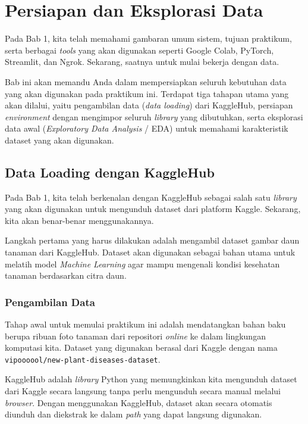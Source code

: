 ﻿\chapter{Persiapan dan Eksplorasi Data}

Pada Bab 1, kita telah memahami gambaran umum sistem, tujuan praktikum, serta berbagai \textit{tools} yang akan digunakan seperti Google Colab, PyTorch, Streamlit, dan Ngrok. Sekarang, saatnya untuk mulai bekerja dengan data.

Bab ini akan memandu Anda dalam mempersiapkan seluruh kebutuhan data yang akan digunakan pada praktikum ini. Terdapat tiga tahapan utama yang akan dilalui, yaitu pengambilan data (\textit{data loading}) dari KaggleHub, persiapan \textit{environment} dengan mengimpor seluruh \textit{library} yang dibutuhkan, serta eksplorasi data awal (\textit{Exploratory Data Analysis} / EDA) untuk memahami karakteristik dataset yang akan digunakan.

\section{Data Loading dengan KaggleHub}

Pada Bab 1, kita telah berkenalan dengan KaggleHub sebagai salah satu \textit{library} yang akan digunakan untuk mengunduh dataset dari platform Kaggle. Sekarang, kita akan benar-benar menggunakannya.

Langkah pertama yang harus dilakukan adalah mengambil dataset gambar daun tanaman dari KaggleHub. Dataset akan digunakan sebagai bahan utama untuk melatih model \textit{Machine Learning} agar mampu mengenali kondisi kesehatan tanaman berdasarkan citra daun.

\subsection{Pengambilan Data}

Tahap awal untuk memulai praktikum ini adalah mendatangkan bahan baku berupa ribuan foto tanaman dari repositori \textit{online} ke dalam lingkungan komputasi kita. Dataset yang digunakan berasal dari Kaggle dengan nama \texttt{vipoooool\allowbreak/new\allowbreak-plant\allowbreak-diseases\allowbreak-dataset}.

KaggleHub adalah \textit{library} Python yang memungkinkan kita mengunduh dataset dari Kaggle secara langsung tanpa perlu mengunduh secara manual melalui \textit{browser}. Dengan menggunakan KaggleHub, dataset akan secara otomatis diunduh dan diekstrak ke dalam \textit{path} yang dapat langsung digunakan.

